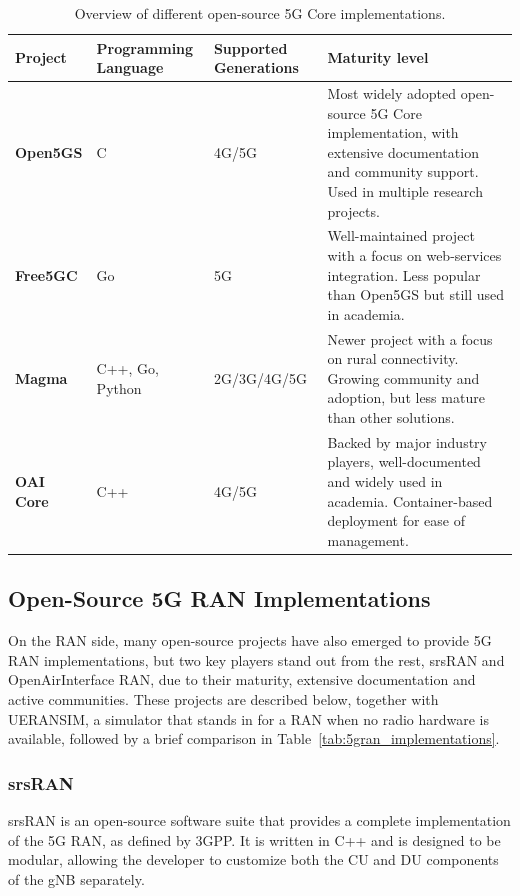 \begin{table}[htbp]
\centering
\footnotesize
\begin{tabularx}{\textwidth}{|l|p{2.2cm}|p{2.1cm}|p{7.5cm}|}
\hline
\rowcolor{gray!30}
\textbf{Project} & \textbf{Programming Language} & \textbf{Supported Generations} & \textbf{Maturity level}\\ \hline
\textbf{Open5GS} & C & 4G/5G & Most widely adopted open-source 5G Core implementation, with extensive documentation and community support. Used in multiple research projects. \\ \hline
\textbf{Free5GC} & Go & 5G & Well-maintained project with a focus on web-services integration. Less popular than Open5GS but still used in academia.\\ \hline
\textbf{Magma} & C++, Go, Python & 2G/3G/4G/5G & Newer project with a focus on rural connectivity. Growing community and adoption, but less mature than other solutions.\\ \hline
\textbf{\gls{OAI} Core} & C++ & 4G/5G & Backed by major industry players, well-documented and widely used in academia. Container-based deployment for ease of management.\\ \hline
\end{tabularx}
\caption{Overview of different open-source 5G Core implementations.}
\label{tab:5gcore_implementations}
\end{table}


\subsection{Open-Source 5G RAN Implementations}
\label{sec:open_source_5g_ran_implementations}
On the \gls{RAN} side, many open-source projects have also emerged to provide 5G \gls{RAN} implementations, but two key players stand out from the rest, srsRAN and OpenAirInterface \gls{RAN}, due to their maturity, extensive documentation and active communities. These projects are described below, together with UERANSIM, a simulator that stands in for a \gls{RAN} when no radio hardware is available, followed by a brief comparison in Table~\ref{tab:5gran_implementations}. 
\subsubsection{srsRAN}
\label{sec:srsran}

srsRAN \cite{ocudu_project} is an open-source software suite that provides a complete implementation of the 5G \gls{RAN}, as defined by \gls{3GPP}. It is written in C++ and is designed to be modular, allowing the developer to customize both the \gls{CU} and \gls{DU} components of the \gls{gNB} separately.

